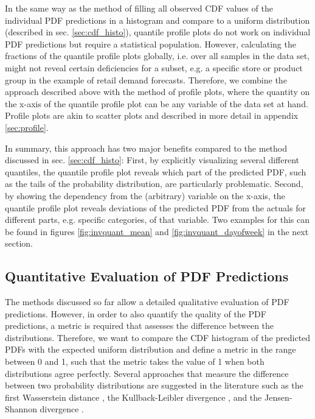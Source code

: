 \documentclass[BCOR=1mm, DIV=calc,10pt,
twoside=true,
twocolumn,
headings=normal]{scrartcl}
\begin{document}
In the same way as the method of filling all observed CDF values of the individual PDF predictions in a histogram and compare to a uniform distribution (described in sec. \ref{sec:cdf_histo}), quantile profile plots do not work on individual PDF predictions but require a statistical population. However, calculating the fractions of the quantile profile plots globally, i.e. over all samples in the data set, might not reveal certain deficiencies for a subset, e.g. a specific store or product group in the example of retail demand forecasts. Therefore, we combine the approach described above with the method of profile plots, where the quantity on the x-axis of the quantile profile plot can be any variable of the data set at hand. Profile plots are akin to scatter plots and described in more detail in appendix \ref{sec:profile}.

In summary, this approach has two major benefits compared to the method discussed in sec. \ref{sec:cdf_histo}: First, by explicitly visualizing several different quantiles, the quantile profile plot reveals which part of the predicted PDF, such as the tails of the probability distribution, are particularly problematic. Second, by showing the dependency from the (arbitrary) variable on the x-axis, the quantile profile plot reveals deviations of the predicted PDF from the actuals for different parts, e.g. specific categories, of that variable. Two examples for this can be found in figures \ref{fig:invquant_mean} and \ref{fig:invquant_dayofweek} in the next section.

\subsection{Quantitative Evaluation of PDF Predictions}
\label{sec:cdf_acc}

The methods discussed  so far allow a detailed qualitative evaluation of PDF predictions. However, in order to also quantify the quality of the PDF predictions, a metric is required that assesses the difference between the distributions. Therefore, we want to compare the CDF histogram of the predicted PDFs with the expected  uniform distribution and define a metric in the range between 0 and 1, such that the metric takes the value of 1 when both distributions agree perfectly. Several approaches that measure the difference between two probability distributions are suggested in the literature such as  the first Wasserstein distance \cite{olkin1982}, the Kullback-Leibler divergence \cite{kullback1951}, and the Jensen-Shannon divergence  \cite{dagan1997}.
\end{document}
